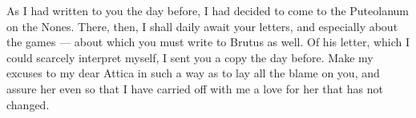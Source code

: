 

 As I had written to you the day before, I had decided to come to the Puteolanum on the Nones. There, then, I shall daily await your letters, and especially about the games --- about which you must write to Brutus as well. Of his letter, which I could scarcely interpret myself, I sent you a copy the day before. Make my excuses to my dear Attica in such a way as to lay all the blame on you, and assure her even so that I have carried off with me a love for her that has not changed.
